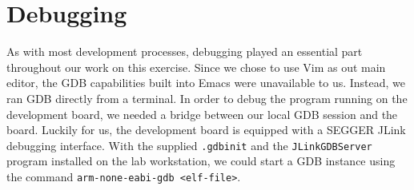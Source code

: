 \section{Debugging}

As with most development processes, debugging played an essential part throughout our work on this exercise. Since we chose to use Vim as out main editor, the GDB capabilities built into Emacs were unavailable to us. Instead, we ran GDB directly from a terminal. In order to debug the program running on the development board, we needed a bridge between our local GDB session and the board. Luckily for us, the development board is equipped with a SEGGER JLink debugging interface. With the supplied \texttt{.gdbinit} and the \texttt{JLinkGDBServer} program installed on the lab workstation, we could start a GDB instance using the command \texttt{arm-none-eabi-gdb <elf-file>}.
